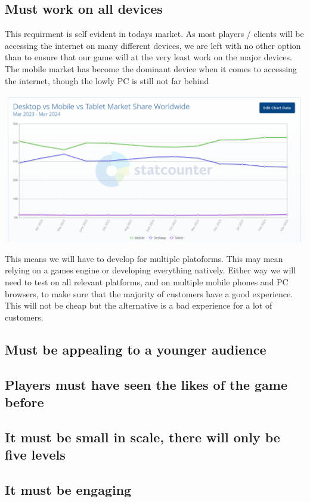 \documentclass{article}
\begin{document}
\subsection{ Must work on all devices }
This requirment is self evident in todays market. As most players / clients will be accessing the internet on many different devices, we are left with no other option than to ensure that our game will at the very least work on the major devices.
The mobile market has become the dominant device when it comes to accessing the internet, though the lowly PC is still not far behind \cite{mobile}

\includegraphics[scale=0.5]{MobileVsPC}

This means we will have to develop for multiple platoforms. This may mean relying on a games engine or developing everything natively. Either way we will need to test on all relevant platforms, and on multiple mobile phones and PC browsers, to make sure that the majority of customers have a good experience. This will not be cheap but the alternative is a bad experience for a lot of customers.

\subsection{ Must be appealing to a younger audience }
\subsection{ Players must have seen the likes of the game before }
\subsection{ It must be small in scale, there will only be five levels }
\subsection{ It must be engaging }
\end{document}
